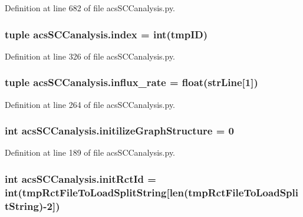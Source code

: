 Definition at line 682 of file acs\-S\-C\-Canalysis.\-py.

\hypertarget{a00096_aaac3bb67a998c4a09aeed8f1adec2f9c}{
\subsubsection[{index}]{\setlength{\rightskip}{0pt plus 5cm}tuple acs\-S\-C\-Canalysis.\-index = int(tmp\-I\-D)}}\label{a00096_aaac3bb67a998c4a09aeed8f1adec2f9c}


Definition at line 326 of file acs\-S\-C\-Canalysis.\-py.

\hypertarget{a00096_a3a8adee26325d72aca909e91b0fd3ea5}{
\subsubsection[{influx\-\_\-rate}]{\setlength{\rightskip}{0pt plus 5cm}tuple acs\-S\-C\-Canalysis.\-influx\-\_\-rate = float({\bf str\-Line}\mbox{[}1\mbox{]})}}\label{a00096_a3a8adee26325d72aca909e91b0fd3ea5}


Definition at line 264 of file acs\-S\-C\-Canalysis.\-py.

\hypertarget{a00096_ac6ad18bfc83e8ea3254897d46f990855}{
\subsubsection[{initilize\-Graph\-Structure}]{\setlength{\rightskip}{0pt plus 5cm}int acs\-S\-C\-Canalysis.\-initilize\-Graph\-Structure = 0}}\label{a00096_ac6ad18bfc83e8ea3254897d46f990855}


Definition at line 189 of file acs\-S\-C\-Canalysis.\-py.

\hypertarget{a00096_a212643643fc6b002e8797f16633bb16d}{
\subsubsection[{init\-Rct\-Id}]{\setlength{\rightskip}{0pt plus 5cm}int acs\-S\-C\-Canalysis.\-init\-Rct\-Id = int({\bf tmp\-Rct\-File\-To\-Load\-Split\-String}\mbox{[}len({\bf tmp\-Rct\-File\-To\-Load\-Split\-String})-\/2\mbox{]})}}\label{a00096_a212643643fc6b002e8797f16633bb16d}


